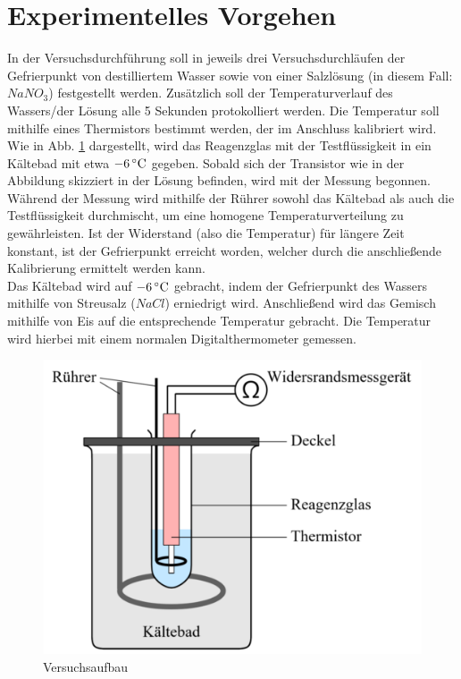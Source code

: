 \section{Experimentelles Vorgehen}
In der Versuchsdurchführung soll in jeweils drei Versuchsdurchläufen der Gefrierpunkt von destilliertem Wasser sowie von einer Salzlösung (in diesem Fall: $NaNO_3$) festgestellt werden. Zusätzlich soll der Temperaturverlauf des Wassers/der Lösung alle 5 Sekunden protokolliert werden. Die Temperatur soll mithilfe eines Thermistors bestimmt werden, der im Anschluss kalibriert wird. Wie in Abb. \ref{fig:aufbau} dargestellt, wird das Reagenzglas mit der Testflüssigkeit in ein Kältebad mit etwa $\unit[-6]{^\circ C}$ gegeben. Sobald sich der Transistor wie in der Abbildung skizziert in der Lösung befinden, wird mit der Messung begonnen. Während der Messung wird mithilfe der Rührer sowohl das Kältebad als auch die Testflüssigkeit durchmischt, um eine homogene Temperaturverteilung zu gewährleisten. Ist der Widerstand (also die Temperatur) für längere Zeit konstant, ist der Gefrierpunkt erreicht worden, welcher durch die anschließende Kalibrierung ermittelt werden kann.\\
Das Kältebad wird auf $\unit[-6]{^\circ C}$ gebracht, indem der Gefrierpunkt des Wassers mithilfe von Streusalz ($NaCl$) erniedrigt wird. Anschließend wird das Gemisch mithilfe von Eis auf die entsprechende Temperatur gebracht. Die Temperatur wird hierbei mit einem normalen Digitalthermometer gemessen.


\begin{figure}
\begin{center}
\includegraphics[scale=0.5]{Bilder/Versuchsaufbau.png}
\caption{Versuchsaufbau}
\label{fig:aufbau}
\end{center}
\end{figure}
